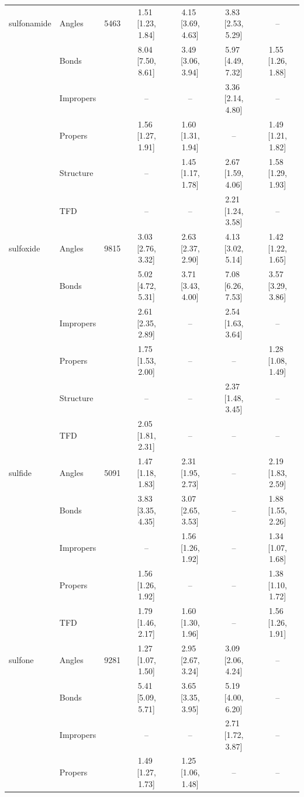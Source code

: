 \begin{longtable}[c]{ ll | r | c c c c}
    sulfonamide & Angles & 5463 & 1.51\,\,[1.23, 1.84] & 4.15\,\,[3.69, 4.63] & 3.83\,\,[2.53, 5.29] & -- \\
     & Bonds &  & 8.04\,\,[7.50, 8.61] & 3.49\,\,[3.06, 3.94] & 5.97\,\,[4.49, 7.32] & 1.55\,\,[1.26, 1.88] \\
     & Impropers &  & -- & -- & 3.36\,\,[2.14, 4.80] & -- \\
     & Propers &  & 1.56\,\,[1.27, 1.91] & 1.60\,\,[1.31, 1.94] & -- & 1.49\,\,[1.21, 1.82] \\
     & Structure &  & -- & 1.45\,\,[1.17, 1.78] & 2.67\,\,[1.59, 4.06] & 1.58\,\,[1.29, 1.93] \\
     & TFD &  & -- & -- & 2.21\,\,[1.24, 3.58] & -- \\
    \hline
    sulfoxide & Angles & 9815 & 3.03\,\,[2.76, 3.32] & 2.63\,\,[2.37, 2.90] & 4.13\,\,[3.02, 5.14] & 1.42\,\,[1.22, 1.65] \\
     & Bonds &  & 5.02\,\,[4.72, 5.31] & 3.71\,\,[3.43, 4.00] & 7.08\,\,[6.26, 7.53] & 3.57\,\,[3.29, 3.86] \\
     & Impropers &  & 2.61\,\,[2.35, 2.89] & -- & 2.54\,\,[1.63, 3.64] & -- \\
     & Propers &  & 1.75\,\,[1.53, 2.00] & -- & -- & 1.28\,\,[1.08, 1.49] \\
     & Structure &  & -- & -- & 2.37\,\,[1.48, 3.45] & -- \\
     & TFD &  & 2.05\,\,[1.81, 2.31] & -- & -- & -- \\
    \hline
    sulfide & Angles & 5091 & 1.47\,\,[1.18, 1.83] & 2.31\,\,[1.95, 2.73] & -- & 2.19\,\,[1.83, 2.59] \\
     & Bonds &  & 3.83\,\,[3.35, 4.35] & 3.07\,\,[2.65, 3.53] & -- & 1.88\,\,[1.55, 2.26] \\
     & Impropers &  & -- & 1.56\,\,[1.26, 1.92] & -- & 1.34\,\,[1.07, 1.68] \\
     & Propers &  & 1.56\,\,[1.26, 1.92] & -- & -- & 1.38\,\,[1.10, 1.72] \\
     & TFD &  & 1.79\,\,[1.46, 2.17] & 1.60\,\,[1.30, 1.96] & -- & 1.56\,\,[1.26, 1.91] \\
    \hline
    sulfone & Angles & 9281 & 1.27\,\,[1.07, 1.50] & 2.95\,\,[2.67, 3.24] & 3.09\,\,[2.06, 4.24] & -- \\
     & Bonds &  & 5.41\,\,[5.09, 5.71] & 3.65\,\,[3.35, 3.95] & 5.19\,\,[4.00, 6.20] & -- \\
     & Impropers &  & -- & -- & 2.71\,\,[1.72, 3.87] & -- \\
     & Propers &  & 1.49\,\,[1.27, 1.73] & 1.25\,\,[1.06, 1.48] & -- & -- \\

\end{longtable}
